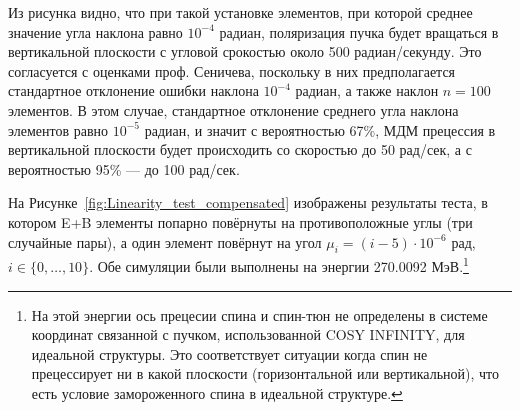 Из рисунка видно, что при такой установке элементов, при которой среднее значение угла наклона равно $10^{-4}$ радиан, поляризация пучка будет вращаться в вертикальной плоскости с угловой срокостью около 500 радиан/секунду. Это согласуется с оценками проф. Сеничева, поскольку в них предполагается стандартное отклонение ошибки наклона $10^{-4}$ радиан, а также наклон $n=100$ элементов. В этом случае, стандартное отклонение среднего угла наклона элементов равно $10^{-5}$ радиан, и значит с вероятностью 67\%, МДМ прецессия в вертикальной плоскости будет происходить со скоростью до 50 рад/сек, а с вероятностью 95\% --- до 100 рад/сек.

На Рисунке~\ref{fig:Linearity_test_compensated} изображены результаты теста, в котором E+B элементы попарно повёрнуты на противоположные углы (три случайные пары), а один элемент повёрнут на угол
$\mu_i = (i-5)\cdot 10^{-6}$ рад, $i\in\lbrace0,\dots,10\rbrace$. Обе симуляции были выполнены на энергии
270.0092 МэВ.\footnote{На этой энергии ось прецесии спина и спин-тюн
	не определены в системе координат связанной с пучком, использованной
	COSY INFINITY, для идеальной структуры. Это соответствует ситуации
	когда спин не прецессирует ни в какой плоскости (горизонтальной или
	вертикальной), что есть условие замороженного спина в идеальной структуре.}

